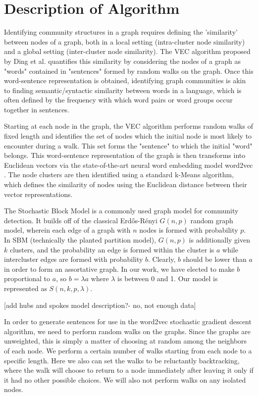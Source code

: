 \documentclass{article}
\begin{document}
\section{Description of Algorithm}

Identifying community structures in a graph requires defining the 'similarity'
between nodes of a graph, both in a local setting (intra-cluster node
similarity) and a global setting (inter-cluster node similarity). The VEC
algorithm proposed by Ding et al. \cite{NodeEmbed} quantifies this similarity by
considering the nodes of a graph as "words" contained in "sentences" formed by
random walks on the graph. Once this word-sentence representation is obtained,
identifying graph communities is akin to finding semantic/syntactic similarity
between words in a language, which is often defined by the frequency with which
word pairs or word groups occur together in sentences.

Starting at each node in the graph, the VEC algorithm performs random walks of
fixed length and identifies the set of nodes which the initial node is most
likely to encounter during a walk. This set forms the "sentence" to which the
initial "word" belongs. This word-sentence representation of the graph is then
transforms into Euclidean vectors via the state-of-the-art neural word embedding
model word2vec \cite{word2vec}. The node clusters are then identified using a
standard k-Means algorithm, which defines the similarity of nodes using the
Euclidean distance between their vector representations.

The Stochastic Block Model is a commonly used graph model for community
detection. It builds off of the classical Erdős-Rényi $G(n,p)$ random graph
model, wherein each edge of a graph with $n$ nodes is formed with probability
$p$. In SBM (technically the planted partition model), $G(n,p)$ is additionally
given $k$ clusters, and the probability an edge is formed within the cluster is
$a$ while intercluster edges are formed with probability $b$. Clearly, $b$
should be lower than $a$ in order to form an assortative graph. In our work, we
have elected to make $b$ proportional to $a$, so $b = \lambda a$ where $\lambda$
is between 0 and 1. Our model is represented as $S(n,k,p,\lambda)$.

[add hubs and spokes model description?- no, not enough data]

In order to generate sentences for use in the word2vec stochastic gradient
descent algorithm, we need to perform random walks on the graphs. Since the
graphs are unweighted, this is simply a matter of choosing at random among the
neighbors of each node. We perform a certain number of walks starting from each
node to a specific length. Here we also can set the walks to be reluctantly
backtracking, where the walk will choose to return to a node immediately after
leaving it only if it had no other possible choices. We will also not perform
walks on any isolated nodes.
\end{document}
